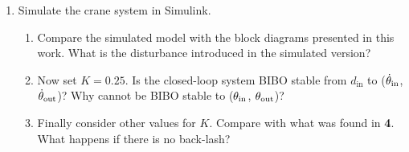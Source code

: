 \begin{enumerate}
\item Simulate the crane system in Simulink. 

\begin{enumerate}
\item Compare the simulated model with the block diagrams presented in this work. What is the disturbance introduced in the simulated version?
\item Now set $K=0.25$. Is the closed-loop system BIBO stable from $d_\textrm{in}$ to ($\operatorname{\dot{\theta}_\textrm{in}}$, $\operatorname{\dot{\theta}_\textrm{out}}$)? Why cannot be BIBO stable to ($\operatorname{\theta_\textrm{in}}$, $\operatorname{\theta_\textrm{out}}$)?
\item Finally consider other values for $K$. Compare with what was found in \textbf{4}. What happens if there is no back-lash?
\end{enumerate}

\end{enumerate}
